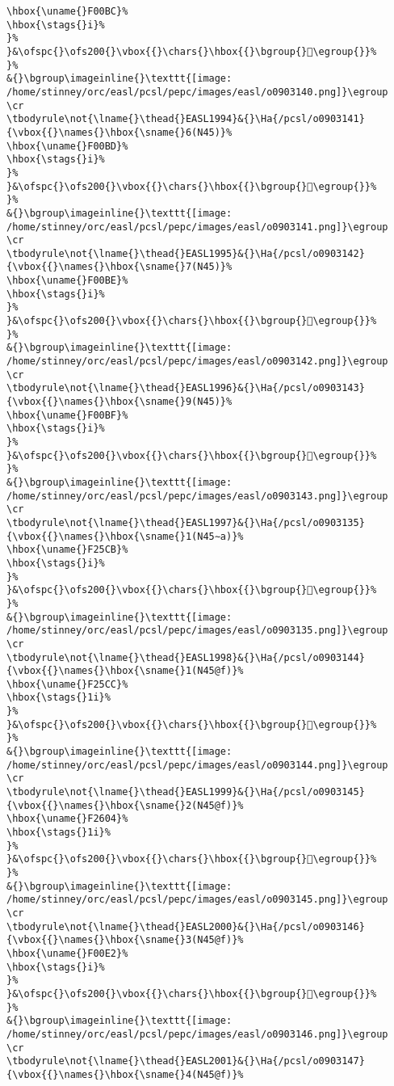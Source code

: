 \begin{verbatim}
\hbox{\uname{}F00BC}%
\hbox{\stags{}i}%
}%
}&\ofspc{}\ofs200{}\vbox{{}\chars{}\hbox{{}\bgroup{}󰂼\egroup{}}%
}%
&{}\bgroup\imageinline{}\texttt{[image: /home/stinney/orc/easl/pcsl/pepc/images/easl/o0903140.png]}\egroup
\cr
\tbodyrule\not{\lname{}\thead{}EASL1994}&{}\Ha{/pcsl/o0903141}{\vbox{{}\names{}\hbox{\sname{}6(N45)}%
\hbox{\uname{}F00BD}%
\hbox{\stags{}i}%
}%
}&\ofspc{}\ofs200{}\vbox{{}\chars{}\hbox{{}\bgroup{}󰂽\egroup{}}%
}%
&{}\bgroup\imageinline{}\texttt{[image: /home/stinney/orc/easl/pcsl/pepc/images/easl/o0903141.png]}\egroup
\cr
\tbodyrule\not{\lname{}\thead{}EASL1995}&{}\Ha{/pcsl/o0903142}{\vbox{{}\names{}\hbox{\sname{}7(N45)}%
\hbox{\uname{}F00BE}%
\hbox{\stags{}i}%
}%
}&\ofspc{}\ofs200{}\vbox{{}\chars{}\hbox{{}\bgroup{}󰂾\egroup{}}%
}%
&{}\bgroup\imageinline{}\texttt{[image: /home/stinney/orc/easl/pcsl/pepc/images/easl/o0903142.png]}\egroup
\cr
\tbodyrule\not{\lname{}\thead{}EASL1996}&{}\Ha{/pcsl/o0903143}{\vbox{{}\names{}\hbox{\sname{}9(N45)}%
\hbox{\uname{}F00BF}%
\hbox{\stags{}i}%
}%
}&\ofspc{}\ofs200{}\vbox{{}\chars{}\hbox{{}\bgroup{}󰂿\egroup{}}%
}%
&{}\bgroup\imageinline{}\texttt{[image: /home/stinney/orc/easl/pcsl/pepc/images/easl/o0903143.png]}\egroup
\cr
\tbodyrule\not{\lname{}\thead{}EASL1997}&{}\Ha{/pcsl/o0903135}{\vbox{{}\names{}\hbox{\sname{}1(N45∼a)}%
\hbox{\uname{}F25CB}%
\hbox{\stags{}i}%
}%
}&\ofspc{}\ofs200{}\vbox{{}\chars{}\hbox{{}\bgroup{}󲗋\egroup{}}%
}%
&{}\bgroup\imageinline{}\texttt{[image: /home/stinney/orc/easl/pcsl/pepc/images/easl/o0903135.png]}\egroup
\cr
\tbodyrule\not{\lname{}\thead{}EASL1998}&{}\Ha{/pcsl/o0903144}{\vbox{{}\names{}\hbox{\sname{}1(N45@f)}%
\hbox{\uname{}F25CC}%
\hbox{\stags{}1i}%
}%
}&\ofspc{}\ofs200{}\vbox{{}\chars{}\hbox{{}\bgroup{}󲗌\egroup{}}%
}%
&{}\bgroup\imageinline{}\texttt{[image: /home/stinney/orc/easl/pcsl/pepc/images/easl/o0903144.png]}\egroup
\cr
\tbodyrule\not{\lname{}\thead{}EASL1999}&{}\Ha{/pcsl/o0903145}{\vbox{{}\names{}\hbox{\sname{}2(N45@f)}%
\hbox{\uname{}F2604}%
\hbox{\stags{}1i}%
}%
}&\ofspc{}\ofs200{}\vbox{{}\chars{}\hbox{{}\bgroup{}󲘄\egroup{}}%
}%
&{}\bgroup\imageinline{}\texttt{[image: /home/stinney/orc/easl/pcsl/pepc/images/easl/o0903145.png]}\egroup
\cr
\tbodyrule\not{\lname{}\thead{}EASL2000}&{}\Ha{/pcsl/o0903146}{\vbox{{}\names{}\hbox{\sname{}3(N45@f)}%
\hbox{\uname{}F00E2}%
\hbox{\stags{}i}%
}%
}&\ofspc{}\ofs200{}\vbox{{}\chars{}\hbox{{}\bgroup{}󰃢\egroup{}}%
}%
&{}\bgroup\imageinline{}\texttt{[image: /home/stinney/orc/easl/pcsl/pepc/images/easl/o0903146.png]}\egroup
\cr
\tbodyrule\not{\lname{}\thead{}EASL2001}&{}\Ha{/pcsl/o0903147}{\vbox{{}\names{}\hbox{\sname{}4(N45@f)}%

\end{verbatim}
